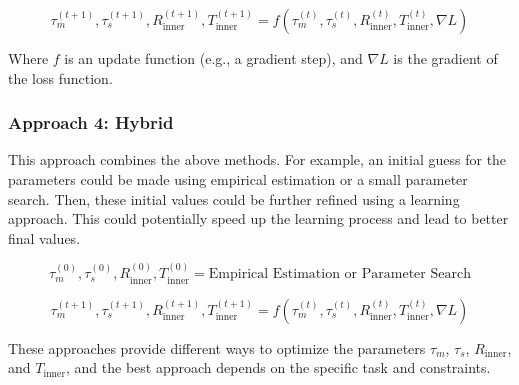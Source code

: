 \begin{equation}
\tau_m^{(t+1)}, \tau_s^{(t+1)}, R_{\text{inner}}^{(t+1)}, T_{\text{inner}}^{(t+1)} = f(\tau_m^{(t)}, \tau_s^{(t)}, R_{\text{inner}}^{(t)}, T_{\text{inner}}^{(t)}, \nabla L)
\end{equation}

Where $f$ is an update function (e.g., a gradient step), and $\nabla L$ is the gradient of the loss function.

\subsubsection{Approach 4: Hybrid}

This approach combines the above methods. For example, an initial guess for the parameters could be made using empirical estimation or a small parameter search. Then, these initial values could be further refined using a learning approach. This could potentially speed up the learning process and lead to better final values.

\begin{equation}
\tau_m^{(0)}, \tau_s^{(0)}, R_{\text{inner}}^{(0)}, T_{\text{inner}}^{(0)} = \text{Empirical Estimation or Parameter Search}
\end{equation}

\begin{equation}
\tau_m^{(t+1)}, \tau_s^{(t+1)}, R_{\text{inner}}^{(t+1)}, T_{\text{inner}}^{(t+1)} = f(\tau_m^{(t)}, \tau_s^{(t)}, R_{\text{inner}}^{(t)}, T_{\text{inner}}^{(t)}, \nabla L)
\end{equation}

These approaches provide different ways to optimize the parameters $\tau_m$, $\tau_s$, $R_{\text{inner}}$, and $T_{\text{inner}}$, and the best approach depends on the specific task and constraints.